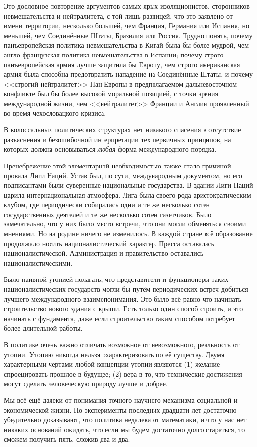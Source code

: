 Это дословное повторение аргументов самых ярых изоляционистов, сторонников невмешательства и нейтралитета, с той лишь разницей, что это заявлено от имени территории, несколько большей, чем Франция, Германия или Испания, но меньшей, чем Соединённые Штаты, Бразилия или Россия. Трудно понять, почему панъевропейская политика невмешательства в Китай была бы более мудрой, чем англо-французская политика невмешательства в Испании; почему строго панъевропейская армия лучше защитила бы Европу, чем строго американская армия была способна предотвратить нападение на Соединённые Штаты, и почему <<строгий нейтралитет>> Пан-Европы в предполагаемом дальневосточном конфликте был бы более высокой моральной позицией, с точки зрения международной жизни, чем <<нейтралитет>> Франции и Англии проявленный во время чехословацкого кризиса.

В колоссальных политических структурах нет никакого спасения в отсутствие разъяснения и безошибочной интерпретации тех первичных принципов, на которых должна основываться \textit{любая} форма международного порядка.

Пренебрежение этой элементарной необходимостью также стало причиной провала Лиги Наций. Устав был, по сути, международным документом, но его подписантами были суверенные национальные государства. В здании Лиги Наций царила интернациональная атмосфера. Лига была своего рода аристократическим клубом, где периодически собирались одни и те же несколько сотен государственных деятелей и те же несколько сотен газетчиков. Было замечательно, что у них было место встречи, что они могли обменяться своими мнениями. Но на родине ничего не изменилось. В каждой стране всё образование продолжало носить националистический характер. Пресса оставалась националистической. Администрация и правительство оставались националистическими.

Было наивной утопией полагать, что представители и функционеры таких националистических государств могли бы путём периодических встреч добиться лучшего международного взаимопонимания. Это было всё равно что начинать строительство нового здания с крыши. Есть только один способ строить, и это начинать с фундамента, даже если строительство таким способом потребует более длительной работы.

В политике очень важно отличать возможное от невозможного, реальность от утопии. Утопию никогда нельзя охарактеризовать по её существу. Двумя характерными чертами любой концепции утопии являются (1) желание спроецировать прошлое в будущее; (2) вера в то, что технические достижения могут сделать человеческую природу лучше и добрее.

Мы всё ещё далеки от понимания точного научного механизма социальной и экономической жизни. Но эксперименты последних двадцати лет достаточно убедительно доказывают, что политика недалека от математики, и что у нас нет никаких оснований ожидать, что если мы будем достаточно долго стараться, то сможем получить пять, сложив два и два.
